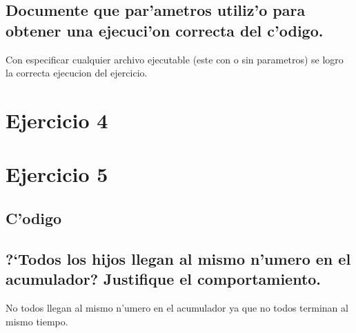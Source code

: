 \documentclass[a4paper,8pt]{article}
\newcommand{\?}{?`}
\begin{document}
\subsection[Punto D]{Documente que par'ametros utiliz'o para obtener una ejecuci'on correcta del c'odigo.}
Con especificar cualquier archivo ejecutable (este con o sin parametros) se logro la correcta ejecucion del ejercicio.

\section{Ejercicio 4}


\section{Ejercicio 5}
\subsection{C'odigo}


\subsection[Punto A]{\?Todos los hijos llegan al mismo n'umero en el acumulador? Justifique el comportamiento.}
No todos llegan al mismo n'umero en el acumulador ya que no todos terminan al mismo tiempo.
\end{document}
